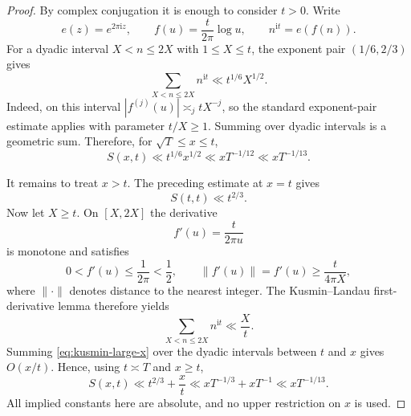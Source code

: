 \documentclass[12pt,reqno]{amsart}
\theoremstyle{remark}
\numberwithin{equation}{section}
\newcommand{\ii}{\mathrm i}
\begin{document}
\begin{proof}
By complex conjugation it is enough to consider $t>0$.  Write
\[
e(z)=e^{2\pi\ii z},
\qquad
f(u)=\frac{t}{2\pi}\log u,
\qquad n^{\ii t}=e(f(n)).
\]
For a dyadic interval $X<n\le2X$ with $1\le X\le t$, the exponent pair
$(1/6,2/3)$ gives
\begin{equation}\label{eq:dyadic-exponent-pair}
\sum_{X<n\le2X}n^{\ii t}
\ll t^{1/6}X^{1/2}.
\end{equation}
Indeed, on this interval
$|f^{(j)}(u)|\asymp_j tX^{-j}$, so the standard exponent-pair estimate
applies with parameter $t/X\ge1$.  Summing over dyadic intervals is a
geometric sum.  Therefore, for $\sqrt T\le x\le t$,
\[
S(x,t)\ll t^{1/6}x^{1/2}
\ll xT^{-1/12}
\ll xT^{-1/13}.
\]

It remains to treat $x>t$.  The preceding estimate at $x=t$ gives
\[
S(t,t)\ll t^{2/3}.
\]
Now let $X\ge t$.  On $[X,2X]$ the derivative
\[
f'(u)=\frac{t}{2\pi u}
\]
is monotone and satisfies
\[
0<f'(u)\le\frac1{2\pi}<\frac12,
\qquad
\|f'(u)\|=f'(u)\ge \frac{t}{4\pi X},
\]
where $\|\cdot\|$ denotes distance to the nearest integer.  The
Kusmin--Landau first-derivative lemma therefore yields
\begin{equation}\label{eq:kusmin-large-x}
\sum_{X<n\le2X}n^{\ii t}\ll \frac{X}{t}.
\end{equation}
Summing \eqref{eq:kusmin-large-x} over the dyadic intervals between $t$
and $x$ gives $O(x/t)$.  Hence, using $t\asymp T$ and $x\ge t$,
\[
S(x,t)
\ll t^{2/3}+\frac{x}{t}
\ll xT^{-1/3}+xT^{-1}
\ll xT^{-1/13}.
\]
All implied constants here are absolute, and no upper restriction on $x$
is used.
\end{proof}
\end{document}
